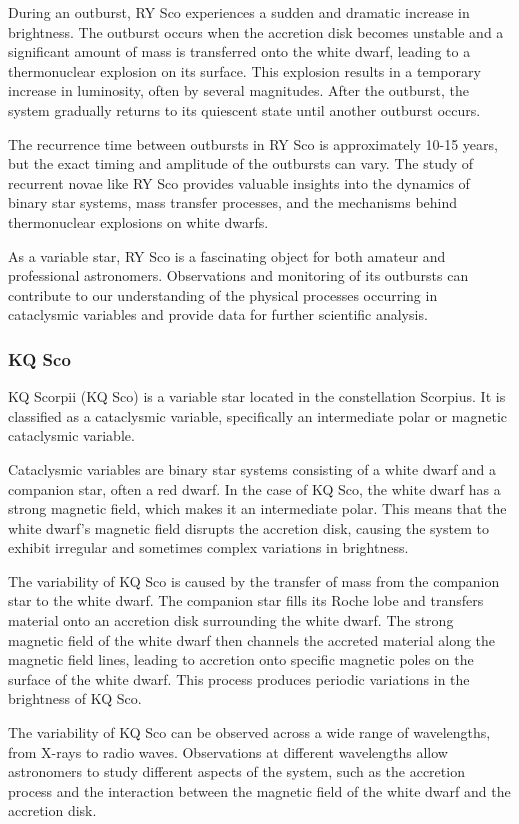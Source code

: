 During an outburst, RY Sco experiences a sudden and dramatic increase in brightness. The outburst occurs when the accretion disk becomes unstable and a significant amount of mass is transferred onto the white dwarf, leading to a thermonuclear explosion on its surface. This explosion results in a temporary increase in luminosity, often by several magnitudes. After the outburst, the system gradually returns to its quiescent state until another outburst occurs.

The recurrence time between outbursts in RY Sco is approximately 10-15 years, but the exact timing and amplitude of the outbursts can vary. The study of recurrent novae like RY Sco provides valuable insights into the dynamics of binary star systems, mass transfer processes, and the mechanisms behind thermonuclear explosions on white dwarfs.

As a variable star, RY Sco is a fascinating object for both amateur and professional astronomers. Observations and monitoring of its outbursts can contribute to our understanding of the physical processes occurring in cataclysmic variables and provide data for further scientific analysis.

\subsubsection*{ KQ Sco }
KQ Scorpii (KQ Sco) is a variable star located in the constellation Scorpius. It is classified as a cataclysmic variable, specifically an intermediate polar or magnetic cataclysmic variable.

Cataclysmic variables are binary star systems consisting of a white dwarf and a companion star, often a red dwarf. In the case of KQ Sco, the white dwarf has a strong magnetic field, which makes it an intermediate polar. This means that the white dwarf's magnetic field disrupts the accretion disk, causing the system to exhibit irregular and sometimes complex variations in brightness.

The variability of KQ Sco is caused by the transfer of mass from the companion star to the white dwarf. The companion star fills its Roche lobe and transfers material onto an accretion disk surrounding the white dwarf. The strong magnetic field of the white dwarf then channels the accreted material along the magnetic field lines, leading to accretion onto specific magnetic poles on the surface of the white dwarf. This process produces periodic variations in the brightness of KQ Sco.

The variability of KQ Sco can be observed across a wide range of wavelengths, from X-rays to radio waves. Observations at different wavelengths allow astronomers to study different aspects of the system, such as the accretion process and the interaction between the magnetic field of the white dwarf and the accretion disk.

